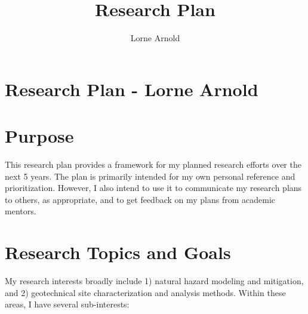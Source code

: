 \documentclass[10pt,letterpaper]{article}
\author{Lorne Arnold}
\title{Research Plan}
\begin{document}
\section*{Research Plan - Lorne Arnold}
\section{Purpose}
This research plan provides a framework for my planned research efforts over the next 5 years.
The plan is primarily intended for my own personal reference and prioritization.
However, I also intend to use it to communicate my research plans to others, as appropriate, and to get feedback on my plans from academic mentors.

\section{Research Topics and Goals}

My research interests broadly include 1) natural hazard modeling and mitigation, and 2) geotechnical site characterization and analysis methods.
Within these areas, I have several sub-interests:
\end{document}
